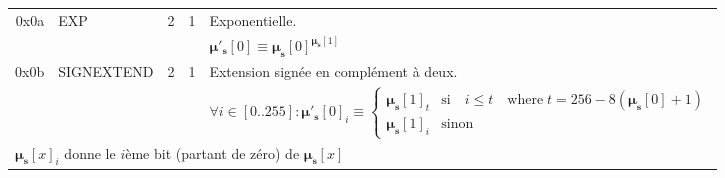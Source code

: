 \documentclass[9pt,oneside]{amsart}
\begin{document}
\begin{tabular*}{\columnwidth}[h]{rlrrl}
\midrule
0x0a & {\small EXP} & 2 & 1 & Exponentielle. \\
&&&& $\boldsymbol{\mu}'_\mathbf{s}[0] \equiv \boldsymbol{\mu}_\mathbf{s}[0] ^ {\boldsymbol{\mu}_\mathbf{s}[1] }$ \\
\midrule
0x0b & {\small SIGNEXTEND} & 2 & 1 & Extension signée en complément à deux. \\
&&&& $ \forall i \in [0..255]: \boldsymbol{\mu}'_\mathbf{s}[0]_i \equiv \begin{cases} \boldsymbol{\mu}_\mathbf{s}[1]_t &\text{si} \quad i \leqslant t \quad \text{where} \; t = 256 - 8(\boldsymbol{\mu}_\mathbf{s}[0] + 1) \\ \boldsymbol{\mu}_\mathbf{s}[1]_i &\text{sinon} \end{cases}$ \\
\multicolumn{5}{l}{$\boldsymbol{\mu}_\mathbf{s}[x]_i$ donne le $i$ème bit (partant de zéro) de $\boldsymbol{\mu}_\mathbf{s}[x]$} \vspace{5pt} \\
\end{tabular*}
\end{document}
